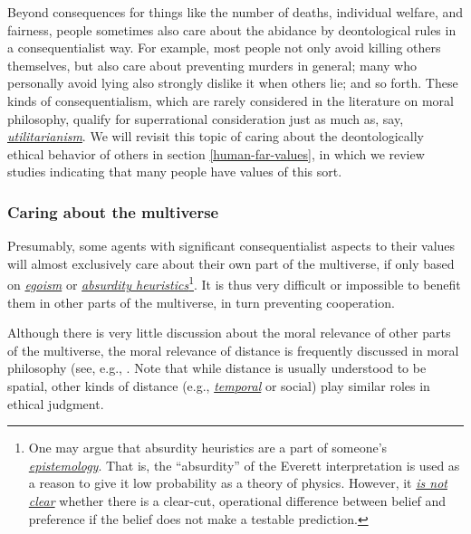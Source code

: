 Beyond consequences for things like the number of deaths, individual
welfare, and fairness, people sometimes also care about the abidance by
deontological rules in a consequentialist way. For example, most people
not only avoid killing others themselves, but also care about preventing
murders in general; many who personally avoid lying also strongly
dislike it when others lie; and so forth. These kinds of
consequentialism, which are rarely considered in the literature on moral
philosophy, qualify for superrational consideration just as much as,
say,
\href{https://en.wikipedia.org/wiki/Utilitarianism}{\emph{utilitarianism}}.
We will revisit this topic of caring about the deontologically ethical
behavior of others in section
\ref{human-far-values}, in
which we review studies indicating that many people have values of this
sort.

\hypertarget{caring-about-the-multiverse}{\subsubsection{Caring about
the multiverse}\label{caring-about-the-multiverse}}

Presumably, some agents with significant consequentialist aspects to
their values will almost exclusively care about their own part of the
multiverse, if only based on
\href{https://en.wikipedia.org/wiki/Ethical_egoism}{\emph{egoism}} or
\href{https://wiki.lesswrong.com/wiki/Absurdity_heuristic}{\emph{absurdity
heuristics}}\footnote{One may argue that absurdity heuristics are a part
  of someone's
  \href{https://en.wikipedia.org/wiki/Epistemology}{\emph{epistemology}}.
  That is, the ``absurdity'' of the Everett interpretation is used as a
  reason to give it low probability as a theory of physics. However, it
  \href{http://reducing-suffering.org/why-does-physics-exist/\#My_new_understanding}{\emph{is
  not clear}} whether there is a clear-cut, operational difference
  between belief and preference if the belief does not make a testable
  prediction.}. It is thus very difficult or impossible to benefit them
in other parts of the multiverse, in turn preventing cooperation.

Although there is very little discussion about the moral relevance of
other parts of the multiverse, the moral relevance of distance is
frequently discussed in moral philosophy (see, e.g.,
\parencite{Brock2013-cv}. Note that while distance is
usually understood to be spatial, other kinds of distance (e.g.,
\href{https://sentience-politics.org/philosophy/the-importance-of-the-future/}{\emph{temporal}}
\parencite{Beckstead2013-lv} or social) play similar roles
in ethical judgment.

